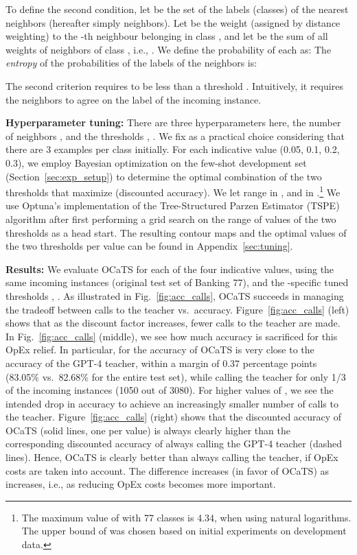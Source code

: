 \documentclass[11pt]{article}
\begin{document}
To define the second condition, let  be the set of the labels (classes) of the  nearest neighbors (hereafter simply neighbors). Let  be the weight (assigned by distance weighting) to the -th neighbour belonging in class , and let  be the sum of all weights of neighbors of class , i.e., . We define the probability  of each  as:
 The \emph{entropy}  of the probabilities  of the labels of the neighbors is:

The second criterion requires  to be less than a threshold . Intuitively, it requires the neighbors to agree on the label of the incoming instance.

\vspace{1mm}\noindent\textbf{Hyperparameter tuning:} 
There are three hyperparameters here, the number of neighbors , and the thresholds , . We fix  as a practical choice considering that there are 3 examples per class initially. For each indicative  value (0.05, 0.1, 0.2, 0.3), we employ Bayesian optimization on the few-shot development set (Section~\ref{sec:exp_setup}) to determine the optimal combination of the two thresholds that maximize  (discounted accuracy). We let  range in , and  in .\footnote{The maximum  value of  with 77 classes is 4.34, when using natural logarithms. The upper bound of  was chosen based on initial experiments on development data.} We use Optuna's \cite{optuna_2019} implementation of the Tree-Structured Parzen Estimator (TSPE) algorithm \cite{NIPS2011_86e8f7ab} after first performing a  grid search on the range of values of the two thresholds as a head start. The resulting contour maps and the optimal values of the two thresholds per  value can be found in Appendix~\ref{sec:tuning}. 


\label{section:results}

\vspace{1mm}\noindent\textbf{Results:} We evaluate OCaTS for each of the four indicative  values, using the same incoming instances (original test set of Banking 77), and the -specific tuned thresholds , . As illustrated in Fig.~\ref{fig:acc_calls}, OCaTS succeeds in managing the tradeoff between calls to the teacher vs.\ accuracy. Figure~\ref{fig:acc_calls} (left) shows that as the discount factor  increases, fewer calls to the teacher are made. In Fig.~\ref{fig:acc_calls} (middle), we see how much accuracy is sacrificed for this OpEx relief. In particular, for  the accuracy of OCaTS is very close to the accuracy of the GPT-4 teacher, within a margin of 0.37 percentage points (83.05\% vs.\ 82.68\% for the entire test set), while calling the teacher for only 1/3 of the incoming instances (1050 out of 3080). For higher values of , we see the intended drop in accuracy to achieve an increasingly smaller number of calls to the teacher. Figure~\ref{fig:acc_calls} (right) shows that the discounted accuracy  of OCaTS (solid lines, one per  value) is always clearly higher than the corresponding discounted accuracy of always calling the GPT-4 teacher (dashed lines). Hence, OCaTS is clearly better than always calling the teacher, if OpEx costs are taken into account. The difference increases (in favor of OCaTS) as  increases, i.e., as  reducing OpEx costs becomes more important.
\end{document}
